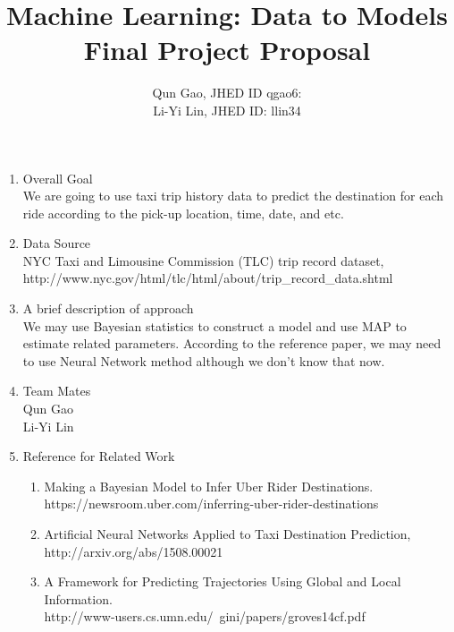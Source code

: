 \documentclass[letterpaper, 11pt]{article}
\title{Machine Learning: Data to Models \\Final Project Proposal}
\author{Qun Gao, JHED ID qgao6: \\Li-Yi Lin, JHED ID: llin34}
\date{}
\begin{document}
\maketitle
\begin{enumerate}%
\item Overall Goal\\
We are going to use taxi trip history data to predict the destination for each ride according to the pick-up location, time, date, and etc. %

\item Data Source\\
NYC Taxi and Limousine Commission (TLC) trip record dataset,\\
http://www.nyc.gov/html/tlc/html/about/trip\_record\_data.shtml

\item A brief description of approach\\
We may use Bayesian statistics to construct a model and use MAP to estimate related parameters. According to the reference paper, we may need to use Neural Network method although we don't know that now.


\item Team Mates\\
	Qun Gao\\
	Li-Yi Lin
\item Reference for Related Work
	\begin{enumerate}
	\item Making a Bayesian Model to Infer Uber Rider Destinations.\\
		https://newsroom.uber.com/inferring-uber-rider-destinations
	\item Artificial Neural Networks Applied to Taxi Destination Prediction,\\
    http://arxiv.org/abs/1508.00021
    \item A Framework for Predicting Trajectories Using Global and Local Information.\\
    http://www-users.cs.umn.edu/~gini/papers/groves14cf.pdf

	\end{enumerate}
\end{enumerate}
\end{document}
